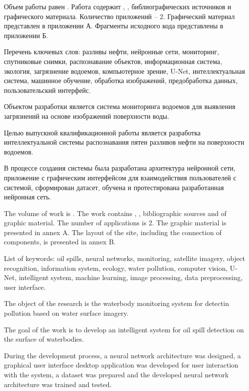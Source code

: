 
Объем работы равен . Работа содержит , ,  библиографических источников и  графического материала. Количество приложений – 2. Графический материал представлен в приложении А. Фрагменты исходного кода представлены в приложении Б.

Перечень ключевых слов: разливы нефти, нейронные сети, мониторинг, спутниковые снимки, распознавание объектов, информационная система, экология, загрязнение водоемов, компьютерное зрение, U-Net, интеллектуальная система, машинное обучение, обработка изображений, предобработка данных, пользовательский интерфейс.

Объектом разработки является система мониторинга водоемов для выявления загрязнений на основе изображений поверхности воды.

Целью выпускной квалификационной работы является разработка интеллектуальной системы распознавания пятен разливов нефти на поверхности водоемов.

В процессе создания системы была разработана архитектура нейронной сети, приложение с графическим интерфейсом для взаимодействия пользователей с системой, сформирован датасет, обучена и протестирована разработанная нейронная сеть.

  
The volume of work is . The work contains , ,  bibliographic sources and  of graphic material. The number of applications is 2. The graphic material is presented in annex A. The layout of the site, including the connection of components, is presented in annex B.

List of keywords: oil spills, neural networks, monitoring, satellite imagery, object recognition, information system, ecology, water pollution, computer vision, U-Net, intelligent system, machine learning, image processing, data preprocessing, user interface.

The object of the research is the waterbody monitoring system for detectin pollution based on water surface imagery.

The goal of the work is to develop an intelligent system for oil spill detection on the surface of waterbodies.

During the development process, a neural network architecture was designed, a graphical user interface desktop application was developed for user interaction with the system, a dataset was prepared and the developed neural network architecture was trained and tested. 
